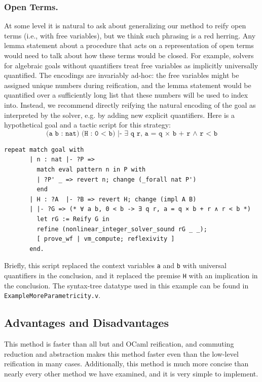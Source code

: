 \subsubsection{Open Terms.}
At some level it is natural to ask about generalizing our method to reify open terms (i.e., with free variables), but we think such phrasing is a red herring.
Any lemma statement about a procedure that acts on a representation of open terms would need to talk about how these terms would be closed.
For example, solvers for algebraic goals without quantifiers treat free variables as implicitly universally quantified.
The encodings are invariably ad-hoc: the free variables might be assigned unique numbers during reification, and the lemma statement would be quantified over a sufficiently long list that these numbers will be used to index into.
Instead, we recommend directly reifying the natural encoding of the goal as interpreted by the solver, e.g. by adding new explicit quantifiers.
Here is a hypothetical goal and a tactic script for this strategy:
\[
  \texttt{(a b : nat) (H : 0 < b) |- ∃ q r, a = q × b + r ∧ r < b}
\]
\begin{verbatim}
repeat match goal with
       | n : nat |- ?P =>
         match eval pattern n in P with
         | ?P' _ => revert n; change (_forall nat P')
         end
       | H : ?A  |- ?B => revert H; change (impl A B)
       | |- ?G => (* ∀ a b, 0 < b -> ∃ q r, a = q × b + r ∧ r < b *)
         let rG := Reify G in
         refine (nonlinear_integer_solver_sound rG _ _);
         [ prove_wf | vm_compute; reflexivity ]
       end.
\end{verbatim}

Briefly, this script replaced the context variables \texttt{a} and \texttt{b} with universal quantifiers in the conclusion, and it replaced the premise \texttt{H} with an implication in the conclusion.
The syntax-tree datatype used in this example can be found in \texttt{ExampleMoreParametricity.v}.

\subsection{Advantages and Disadvantages}
This method is faster than all but  and OCaml reification, and commuting reduction and abstraction makes this method faster even than the low-level  reification in many cases.
Additionally, this method is much more concise than nearly every other method we have examined, and it is very simple to implement.

